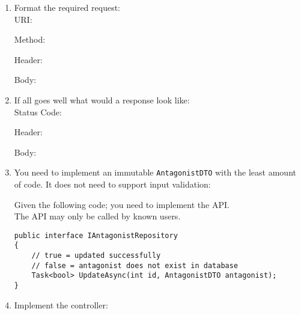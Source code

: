 \begin{enumerate}[a]
    \item {} Format the required request:\\

URI:\ %
\ifdefined\questionFourAnswerAuri
  \newline\answer\questionFourAnswerAuri
\else
\fi

Method:\ %
\ifdefined\questionFourAnswerAmethod
  \newline\answer\questionFourAnswerAmethod
\else
\fi

Header:\ %
\ifdefined\questionFourAnswerAheader
  \newline\answer\questionFourAnswerAheader
\else
\fi

Body:






\newpage
    \item {} If all goes well what would a response look like:\\

Status Code:\ %
\ifdefined\questionFourAnswerBstatus
  \newline\answer\questionFourAnswerBstatus
\else
\fi

Header:\ %
\ifdefined\questionFourAnswerBheader
  \newline\answer\questionFourAnswerBheader
\else
\fi

Body:






    \item {} You need to implement an immutable \texttt{AntagonistDTO} with the least amount of code. It does not need to support input validation:


\noindent Given the following code; you need to implement the API.\\
\noindent The API may only be called by known users.
\begin{lstlisting}
public interface IAntagonistRepository
{
    // true = updated successfully
    // false = antagonist does not exist in database
    Task<bool> UpdateAsync(int id, AntagonistDTO antagonist);
}
\end{lstlisting}





\newpage
    \item {} Implement the controller:



\end{enumerate}

